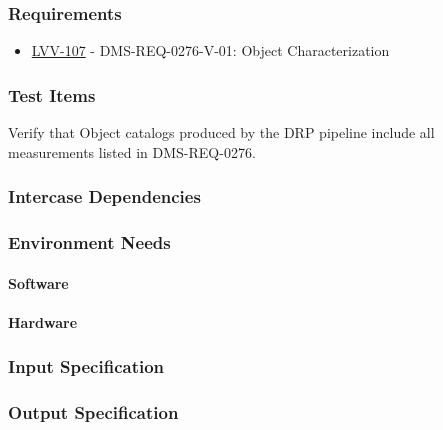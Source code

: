 \subsubsection{Requirements}
\begin{itemize}
\item \href{https://jira.lsstcorp.org/browse/LVV-107}{LVV-107} - DMS-REQ-0276-V-01: Object Characterization
\end{itemize}

\subsubsection{Test Items}
Verify that Object catalogs produced by the DRP pipeline include all
measurements listed in DMS-REQ-0276.



\subsubsection{Intercase Dependencies}

\subsubsection{Environment Needs}

\paragraph{Software}

\paragraph{Hardware}

\subsubsection{Input Specification}

\subsubsection{Output Specification}

